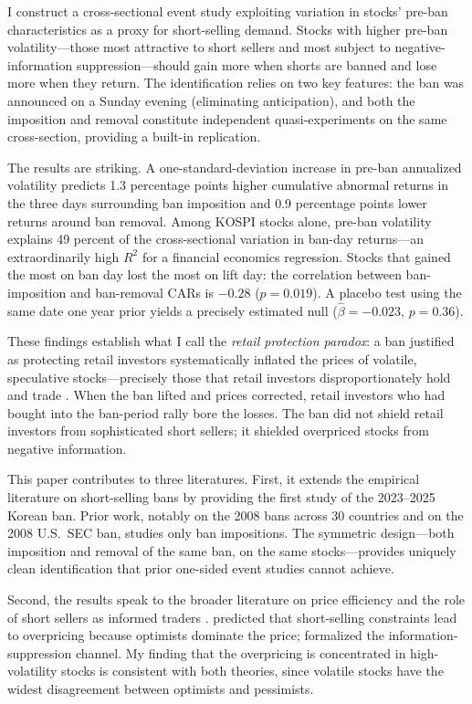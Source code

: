 \documentclass[12pt]{article}
\begin{document}
I construct a cross-sectional event study exploiting variation in stocks' pre-ban characteristics as a proxy for short-selling demand. Stocks with higher pre-ban volatility---those most attractive to short sellers and most subject to negative-information suppression---should gain more when shorts are banned and lose more when they return. The identification relies on two key features: the ban was announced on a Sunday evening (eliminating anticipation), and both the imposition and removal constitute independent quasi-experiments on the same cross-section, providing a built-in replication.

The results are striking. A one-standard-deviation increase in pre-ban annualized volatility predicts 1.3 percentage points higher cumulative abnormal returns in the three days surrounding ban imposition and 0.9 percentage points lower returns around ban removal. Among KOSPI stocks alone, pre-ban volatility explains 49 percent of the cross-sectional variation in ban-day returns---an extraordinarily high $R^2$ for a financial economics regression. Stocks that gained the most on ban day lost the most on lift day: the correlation between ban-imposition and ban-removal CARs is $-0.28$ ($p = 0.019$). A placebo test using the same date one year prior yields a precisely estimated null ($\hat{\beta} = -0.023$, $p = 0.36$).

These findings establish what I call the \textit{retail protection paradox}: a ban justified as protecting retail investors systematically inflated the prices of volatile, speculative stocks---precisely those that retail investors disproportionately hold and trade \citep{barber2008all, kelley2013retail}. When the ban lifted and prices corrected, retail investors who had bought into the ban-period rally bore the losses. The ban did not shield retail investors from sophisticated short sellers; it shielded overpriced stocks from negative information.

This paper contributes to three literatures. First, it extends the empirical literature on short-selling bans by providing the first study of the 2023--2025 Korean ban. Prior work, notably \citet{beber2013short} on the 2008 bans across 30 countries and \citet{boehmer2013short} on the 2008 U.S.\ SEC ban, studies only ban impositions. The symmetric design---both imposition and removal of the same ban, on the same stocks---provides uniquely clean identification that prior one-sided event studies cannot achieve.

Second, the results speak to the broader literature on price efficiency and the role of short sellers as informed traders \citep{diamond1987constraints, miller1977risk, hong2003differences}. \citet{miller1977risk} predicted that short-selling constraints lead to overpricing because optimists dominate the price; \citet{diamond1987constraints} formalized the information-suppression channel. My finding that the overpricing is concentrated in high-volatility stocks is consistent with both theories, since volatile stocks have the widest disagreement between optimists and pessimists.
\end{document}
